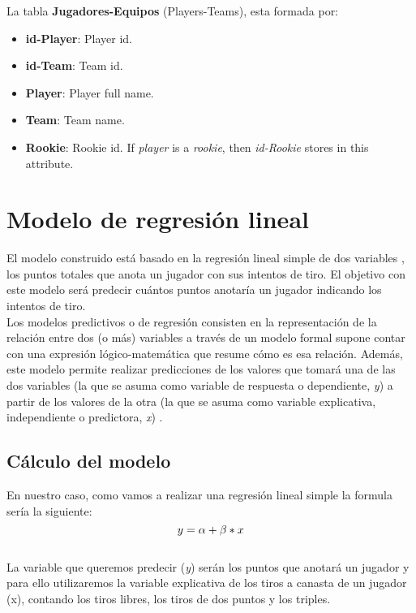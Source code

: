 \documentclass[11pt]{diazessay} %
\begin{document}
La tabla \textbf{Jugadores-Equipos} (Players-Teams), esta formada por:
\begin{itemize}
	\item\textbf{id-Player}: Player id.
	\item\textbf{id-Team}: Team id.
	\item\textbf{Player}: Player full name.
	\item\textbf{Team}: Team name.
	\item\textbf{Rookie}: Rookie id. If \textit{player} is a \textit{rookie}, then \textit{id-Rookie} stores in this attribute.
\end{itemize}

\clearpage

\section*{Modelo de regresión lineal}
El modelo construido está basado en la regresión lineal simple de dos variables \cite{regresion}, los puntos totales que anota un jugador con sus intentos de tiro. El objetivo con este modelo será predecir cuántos puntos anotaría un jugador indicando los intentos de tiro.\\

Los modelos predictivos o de regresión consisten en la representación de la relación entre dos (o más) variables a través de un modelo formal supone contar con una expresión lógico-matemática que resume cómo es esa relación. Además, este modelo permite realizar predicciones de los valores que tomará una de las dos variables (la que se asuma como variable de respuesta o dependiente, \textit{y}) a partir de los valores de la otra (la que se asuma como variable explicativa, independiente o predictora, \textit{x}) \cite{modelo_regresion}.\\

\subsection*{Cálculo del modelo}

En nuestro caso, como vamos a realizar una regresión lineal simple la formula sería la siguiente:\\

\begin{equation}
\centering
y = \alpha + \beta * x
\end{equation}
\\
La variable que queremos predecir (\textit{y}) serán los puntos que anotará un jugador y para ello utilizaremos la variable explicativa de los tiros a canasta de un jugador (x), contando los tiros libres, los tiros de dos puntos y los triples. \\
\end{document}
